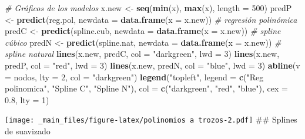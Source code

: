 \documentclass[
]{book}
\newenvironment{Shaded}{\begin{snugshade}}{\end{snugshade}}
\newcommand{\CommentTok}[1]{\textcolor[rgb]{0.56,0.35,0.01}{\textit{#1}}}
\newcommand{\DataTypeTok}[1]{\textcolor[rgb]{0.13,0.29,0.53}{#1}}
\newcommand{\DecValTok}[1]{\textcolor[rgb]{0.00,0.00,0.81}{#1}}
\newcommand{\FloatTok}[1]{\textcolor[rgb]{0.00,0.00,0.81}{#1}}
\newcommand{\KeywordTok}[1]{\textcolor[rgb]{0.13,0.29,0.53}{\textbf{#1}}}
\newcommand{\NormalTok}[1]{#1}
\newcommand{\OperatorTok}[1]{\textcolor[rgb]{0.81,0.36,0.00}{\textbf{#1}}}
\newcommand{\OtherTok}[1]{\textcolor[rgb]{0.56,0.35,0.01}{#1}}
\newcommand{\StringTok}[1]{\textcolor[rgb]{0.31,0.60,0.02}{#1}}
\begin{document}
\begin{Shaded}
\begin{Highlighting}[]
\CommentTok{# Gráficos de los modelos}
\NormalTok{x.new <-}\StringTok{ }\KeywordTok{seq}\NormalTok{(}\KeywordTok{min}\NormalTok{(x), }\KeywordTok{max}\NormalTok{(x), }\DataTypeTok{length =} \DecValTok{500}\NormalTok{)}
\NormalTok{predP <-}\StringTok{ }\KeywordTok{predict}\NormalTok{(reg.pol, }\DataTypeTok{newdata =} \KeywordTok{data.frame}\NormalTok{(}\DataTypeTok{x =}\NormalTok{ x.new)) }\CommentTok{# regresión polinómica}
\NormalTok{predC <-}\StringTok{ }\KeywordTok{predict}\NormalTok{(spline.cub, }\DataTypeTok{newdata =} \KeywordTok{data.frame}\NormalTok{(}\DataTypeTok{x =}\NormalTok{ x.new)) }\CommentTok{# spline cúbico}
\NormalTok{predN <-}\StringTok{ }\KeywordTok{predict}\NormalTok{(spline.nat, }\DataTypeTok{newdata =} \KeywordTok{data.frame}\NormalTok{(}\DataTypeTok{x =}\NormalTok{ x.new)) }\CommentTok{# spline natural}
\KeywordTok{lines}\NormalTok{(x.new, predC, }\DataTypeTok{col =} \StringTok{"darkgreen"}\NormalTok{, }\DataTypeTok{lwd =} \DecValTok{3}\NormalTok{)}
\KeywordTok{lines}\NormalTok{(x.new, predP, }\DataTypeTok{col =} \StringTok{"red"}\NormalTok{, }\DataTypeTok{lwd =} \DecValTok{3}\NormalTok{)}
\KeywordTok{lines}\NormalTok{(x.new, predN, }\DataTypeTok{col =} \StringTok{"blue"}\NormalTok{, }\DataTypeTok{lwd =} \DecValTok{3}\NormalTok{)}
\KeywordTok{abline}\NormalTok{(}\DataTypeTok{v =}\NormalTok{ nodos, }\DataTypeTok{lty =} \DecValTok{2}\NormalTok{, }\DataTypeTok{col =} \StringTok{"darkgreen"}\NormalTok{)}
\KeywordTok{legend}\NormalTok{(}\StringTok{"topleft"}\NormalTok{, }\DataTypeTok{legend =} \KeywordTok{c}\NormalTok{(}\StringTok{"Reg polinomica"}\NormalTok{, }\StringTok{"Spline C"}\NormalTok{, }\StringTok{"Spline N"}\NormalTok{), }\DataTypeTok{col =} \KeywordTok{c}\NormalTok{(}\StringTok{"darkgreen"}\NormalTok{, }\StringTok{"red"}\NormalTok{, }\StringTok{"blue"}\NormalTok{), }\DataTypeTok{cex =} \FloatTok{0.8}\NormalTok{, }\DataTypeTok{lty =} \DecValTok{1}\NormalTok{)}
\end{Highlighting}
\end{Shaded}

\texttt{[image: \_main\_files/figure-latex/polinomios a trozos-2.pdf]}
\#\# Splines de suavizado

\begin{Shaded}
\end{Shaded}
\end{document}
